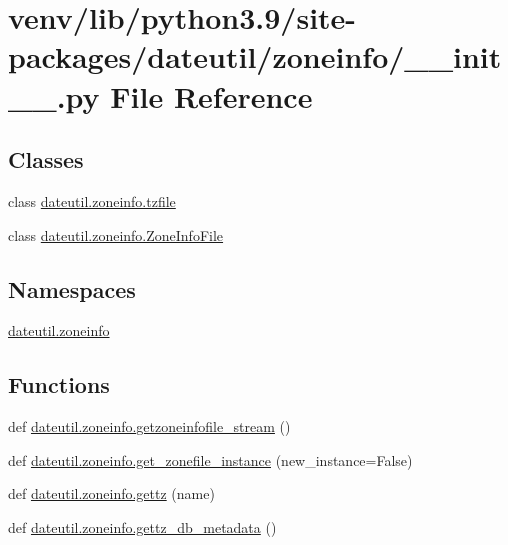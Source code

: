 \hypertarget{venv_2lib_2python3_89_2site-packages_2dateutil_2zoneinfo_2____init_____8py}{}\section{venv/lib/python3.9/site-\/packages/dateutil/zoneinfo/\+\_\+\+\_\+init\+\_\+\+\_\+.py File Reference}
\label{venv_2lib_2python3_89_2site-packages_2dateutil_2zoneinfo_2____init_____8py}
\subsection*{Classes}
\begin{DoxyCompactItemize}
\item 
class \hyperlink{classdateutil_1_1zoneinfo_1_1tzfile}{dateutil.\+zoneinfo.\+tzfile}
\item 
class \hyperlink{classdateutil_1_1zoneinfo_1_1ZoneInfoFile}{dateutil.\+zoneinfo.\+Zone\+Info\+File}
\end{DoxyCompactItemize}
\subsection*{Namespaces}
\begin{DoxyCompactItemize}
\item 
 \hyperlink{namespacedateutil_1_1zoneinfo}{dateutil.\+zoneinfo}
\end{DoxyCompactItemize}
\subsection*{Functions}
\begin{DoxyCompactItemize}
\item 
def \hyperlink{namespacedateutil_1_1zoneinfo_a627f3aa7152a10ca0c6454808b86dce7}{dateutil.\+zoneinfo.\+getzoneinfofile\+\_\+stream} ()
\item 
def \hyperlink{namespacedateutil_1_1zoneinfo_a75c4f3206fb4ce7cac96842fbcec71ea}{dateutil.\+zoneinfo.\+get\+\_\+zonefile\+\_\+instance} (new\+\_\+instance=False)
\item 
def \hyperlink{namespacedateutil_1_1zoneinfo_ad0d7307684458e5d285cbff60c1e2617}{dateutil.\+zoneinfo.\+gettz} (name)
\item 
def \hyperlink{namespacedateutil_1_1zoneinfo_a813fb88c7ca8197be2f9753e04b552ba}{dateutil.\+zoneinfo.\+gettz\+\_\+db\+\_\+metadata} ()
\end{DoxyCompactItemize}
